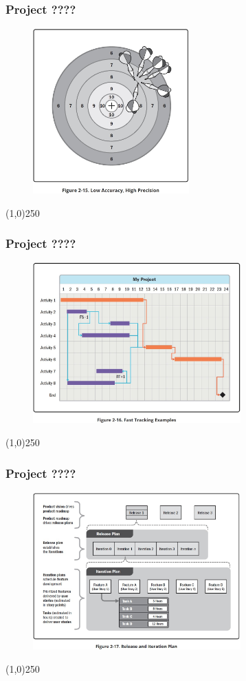 \begin{frame}
\frametitle{Project ????}
 \begin{figure}
    \centering
        \includegraphics[width = 6cm]{../images/guide/Fig2-15.jpg}
    \label{guidefig:2-15}
 \end{figure}
\end{frame}
\begin{center}\line(1,0){250}\end{center}

\begin{frame}
\frametitle{Project ????}
 \begin{figure}
    \centering
        \includegraphics[width = 8cm]{../images/guide/Fig2-16.jpg}
    \label{guidefig:2-16}
 \end{figure}
\end{frame}
\begin{center}\line(1,0){250}\end{center}

\begin{frame}
\frametitle{Project ????}
 \begin{figure}
    \centering
        \includegraphics[width = 8cm]{../images/guide/Fig2-17.jpg}
    \label{guidefig:2-17}
 \end{figure}
\end{frame}
\begin{center}\line(1,0){250}\end{center}

